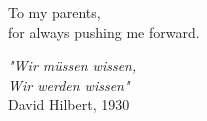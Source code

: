 
%

\begin{ntdedicatory}[10cm]

  \rmfamily
  {\Large To my parents,}\\
  {\large for always pushing me forward.}
  \par   %
  \vspace{4\baselineskip}
  
  \normalfont
  \emph{"Wir m{\"u}ssen wissen,\\ 
  Wir werden wissen"}\\
  \vspace{\baselineskip}
  David Hilbert, 1930

\end{ntdedicatory}

